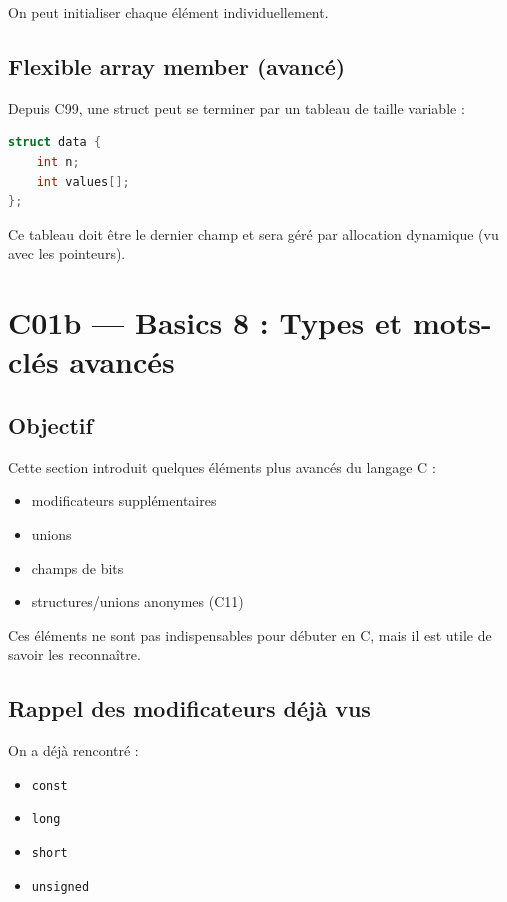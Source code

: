 On peut initialiser chaque élément individuellement.

\subsection{Flexible array member (avancé)}

Depuis C99, une struct peut se terminer par un tableau
de taille variable :

\begin{lstlisting}[language=C]
struct data {
    int n;
    int values[];
};
\end{lstlisting}

Ce tableau doit être le dernier champ et sera géré
par allocation dynamique (vu avec les pointeurs).

\section{C01b — Basics 8 : Types et mots-clés avancés}

\subsection{Objectif}

Cette section introduit quelques éléments plus avancés du langage C :

\begin{itemize}
    \item modificateurs supplémentaires
    \item unions
    \item champs de bits
    \item structures/unions anonymes (C11)
\end{itemize}

Ces éléments ne sont pas indispensables pour débuter en C,
mais il est utile de savoir les reconnaître.

\subsection{Rappel des modificateurs déjà vus}

On a déjà rencontré :

\begin{itemize}
    \item \texttt{const}
    \item \texttt{long}
    \item \texttt{short}
    \item \texttt{unsigned}
\end{itemize}

